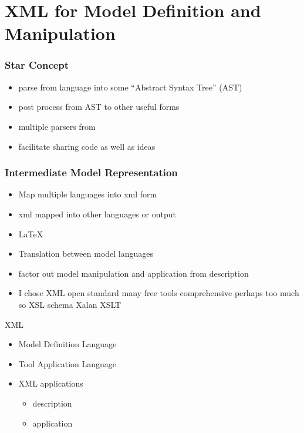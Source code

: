 \documentclass{beamer}
\begin{document}
\section{XML for  Model Definition and Manipulation}

\begin{frame}
  \frametitle{Star Concept}

  \begin{itemize}
  \item parse from language into some ``Abstract Syntax Tree'' (AST)
  \item post process from AST to other useful forms
  \item multiple parsers from
  \item facilitate sharing code as well as ideas
  \end{itemize}

\end{frame}

  \begin{frame}
    \frametitle{Intermediate Model Representation}
    \begin{itemize}
    \item Map multiple languages into xml form
    \item xml mapped into other languages or output
    \item \LaTeX
\item  Translation between model languages
\item factor out model manipulation and application from description
\item I chose XML open standard many free tools comprehensive perhaps too much so  XSL schema Xalan XSLT
    \end{itemize}
  \end{frame}


\begin{frame}{XML }

  \begin{itemize}
  \item Model Definition Language
  \item Tool Application Language
\item XML applications
  \begin{itemize}
  \item description
  \item application
  \end{itemize}
  \end{itemize}

  
\end{frame}
\end{document}
